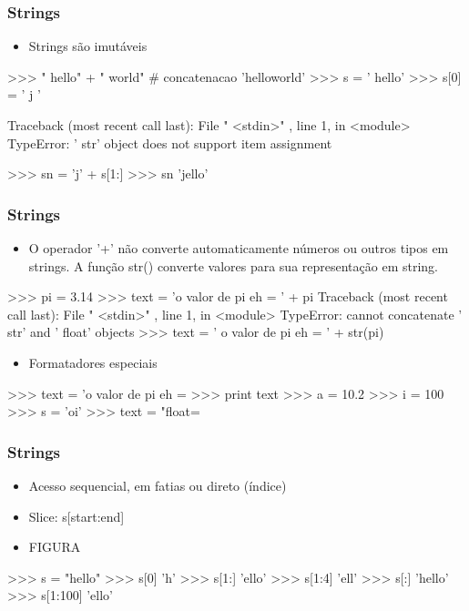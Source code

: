 \documentclass[12pt,t,graphics]{beamer}
\newcommand{\ft}[1]{\frametitle{#1}}
\newcommand{\bi}{\begin{itemize}}
\newcommand{\ei}{\end{itemize}}
\begin{document}

\begin{frame}[fragile]
  \ft{Strings}
  \bi
\item Strings são imutáveis
  \ei	
  \begin{python}
    >>> " hello" + " world" # concatenacao
    'helloworld'
    >>> s = ' hello'
    >>> s[0] = ' j '

    Traceback (most recent call last):
    File " <stdin>" , line 1, in <module>
    TypeError: ' str' object does not support
    item assignment
    
    >>> sn = 'j' + s[1:]
    >>> sn
    'jello'	
  \end{python}
\end{frame}


\begin{frame}[fragile]
  \ft{Strings}
  \bi
\item O operador ’+’ não converte automaticamente
  números ou outros tipos em strings. A função
  str() converte valores para sua representação em
  string.
  \ei	
  \begin{python}
    >>> pi = 3.14
    >>> text = 'o valor de pi eh = ' + pi
    Traceback (most recent call last):
    File " <stdin>" , line 1, in <module>
    TypeError: cannot concatenate ' str' and ' float' objects
    >>> text = ' o valor de pi eh = ' + str(pi)		
  \end{python}
  \bi
\item Formatadores especiais
  \ei
  \begin{python}
    >>> text = 'o valor de pi eh = %
    >>> print text
    >>> a = 10.2
    >>> i = 100
    >>> s = 'oi'
    >>> text = "float=%
  \end{python}		
\end{frame}


\begin{frame}[fragile]
  \ft{Strings}
  \bi
\item Acesso sequencial, em fatias ou direto (índice)
\item Slice: s[start:end]
\item FIGURA
  \ei	
  \begin{python}
    >>> s = "hello"
    >>> s[0]
    'h'
    >>> s[1:]
    'ello'
    >>> s[1:4]
    'ell'
    >>> s[:]
    'hello'
    >>> s[1:100]
    'ello'
  \end{python}	
\end{frame}
\end{document}
